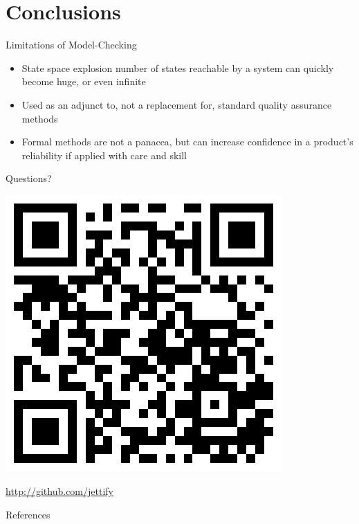 \documentclass[12pt]{beamer}
\begin{document}
  \section{Conclusions}
  \begin{frame}{Limitations of Model-Checking}
    \begin{itemize}
      \item State space explosion number of states reachable by a system
          can quickly become huge, or even infinite
      \item Used as an adjunct to, not a replacement for, standard quality
          assurance methods
      \item Formal methods are not a panacea, but can increase confidence in
          a product’s reliability if applied with care and skill
    \end{itemize}
  \end{frame}
\begin{frame}
    \vspace{1cm}
    \begin{center}{\Huge Questions?} \end{center}
    \begin{center} \includegraphics[scale=0.4]{figures/qrcode.png}\end{center}
    \begin{center}
        \href{http://github.com/jettify}{http://github.com/jettify}
    \end{center}
\end{frame}
\appendix
\begin{frame}[allowframebreaks]{References}
    
    
\end{frame}
\end{document}
